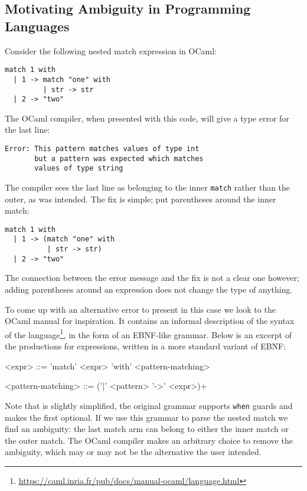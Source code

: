 \documentclass[acmsmall,review,anonymous]{acmart}\settopmatter{printfolios=true,printccs=false,printacmref=false}
\newcommand{\ocaml}{\lstinline[language={[objective]caml}]}
\begin{document}
\subsection{Motivating Ambiguity in Programming Languages}

Consider the following nested match expression in OCaml:

\begin{lstlisting}[language={[objective]caml}]
match 1 with
  | 1 -> match "one" with
         | str -> str
  | 2 -> "two"
\end{lstlisting}

\noindent The OCaml compiler, when presented with this code, will give a type error for the last line:

\begin{lstlisting}
Error: This pattern matches values of type int
       but a pattern was expected which matches
       values of type string
\end{lstlisting}

\noindent The compiler sees the last line as belonging to the inner \ocaml{match} rather than the outer, as was intended. The fix is simple; put parentheses around the inner match:

\begin{lstlisting}[language={[objective]caml}]
match 1 with
  | 1 -> (match "one" with
          | str -> str)
  | 2 -> "two"
\end{lstlisting}

\noindent The connection between the error message and the fix is not a clear one however; adding parentheses around an expression does not change the type of anything.

To come up with an alternative error to present in this case we look to the OCaml manual for inspiration. It contains an informal description of the syntax of the language\footnote{\url{https://caml.inria.fr/pub/docs/manual-ocaml/language.html}}, in the form of an EBNF-like grammar. Below is an excerpt of the productions for expressions, written in a more standard variant of EBNF:

\setlength{\grammarindent}{5em}
\begin{grammar}
<expr> ::= 'match' <expr> 'with' <pattern-matching>

<pattern-matching> ::= ('|' <pattern> '->' <expr>)+
\end{grammar}

Note that  is slightly simplified, the original grammar supports \ocaml{when} guards and makes the first \lit{|} optional. If we use this grammar to parse the nested match we find an ambiguity: the last match arm can belong to either the inner match or the outer match. The OCaml compiler makes an arbitrary choice to remove the ambiguity, which may or may not be the alternative the user intended.
\end{document}
